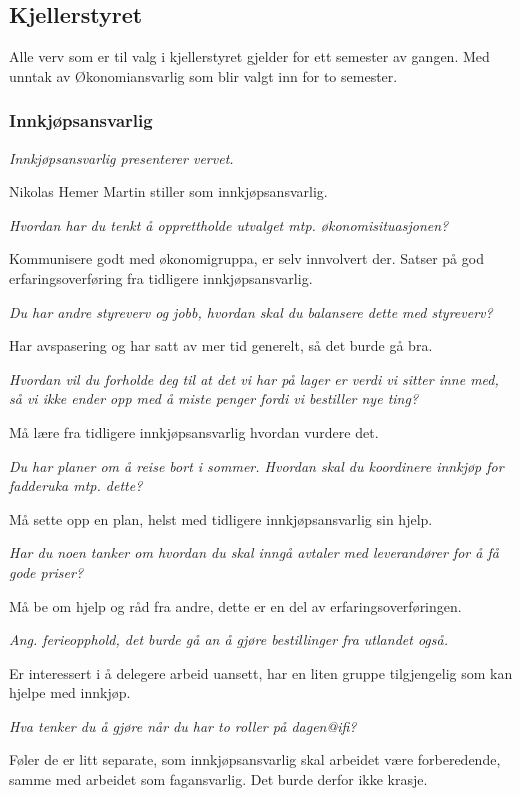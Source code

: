 \documentclass[10pt,norsk,a4paper]{article}
\begin{document}
\begin{minipage}[t]{0.49\textwidth}
\subsection{Kjellerstyret} %
Alle verv som er til valg i kjellerstyret gjelder for ett semester av gangen. Med unntak av Økonomiansvarlig som blir valgt inn for to semester.

\subsubsection{Innkjøpsansvarlig}
\textit{Innkjøpsansvarlig presenterer vervet.}

Nikolas Hemer Martin stiller som innkjøpsansvarlig. 

\emph{Hvordan har du tenkt å opprettholde utvalget mtp. økonomisituasjonen?}

Kommunisere godt med økonomigruppa, er selv innvolvert der. Satser på god erfaringsoverføring fra tidligere innkjøpsansvarlig. 

\emph{Du har andre styreverv og jobb, hvordan skal du balansere dette med styreverv?}

Har avspasering og har satt av mer tid generelt, så det burde gå bra.

\emph{Hvordan vil du forholde deg til at det vi har på lager er verdi vi sitter inne med, så vi ikke ender opp med å miste penger fordi vi bestiller nye ting?}

Må lære fra tidligere innkjøpsansvarlig hvordan vurdere det. 

\emph{Du har planer om å reise bort i sommer. Hvordan skal du koordinere innkjøp for fadderuka mtp. dette?}

Må sette opp en plan, helst med tidligere innkjøpsansvarlig sin hjelp.

\emph{Har du noen tanker om hvordan du skal inngå avtaler med leverandører for å få gode priser?}

Må be om hjelp og råd fra andre, dette er en del av erfaringsoverføringen. 

\emph{Ang. ferieopphold, det burde gå an å gjøre bestillinger fra utlandet også.}

Er interessert i å delegere arbeid uansett, har en liten gruppe tilgjengelig som kan hjelpe med innkjøp.

\emph{Hva tenker du å gjøre når du har to roller på dagen@ifi?}

Føler de er litt separate, som innkjøpsansvarlig skal arbeidet være forberedende, samme med arbeidet som fagansvarlig. Det burde derfor ikke krasje. 


\end{minipage}
\end{document}
